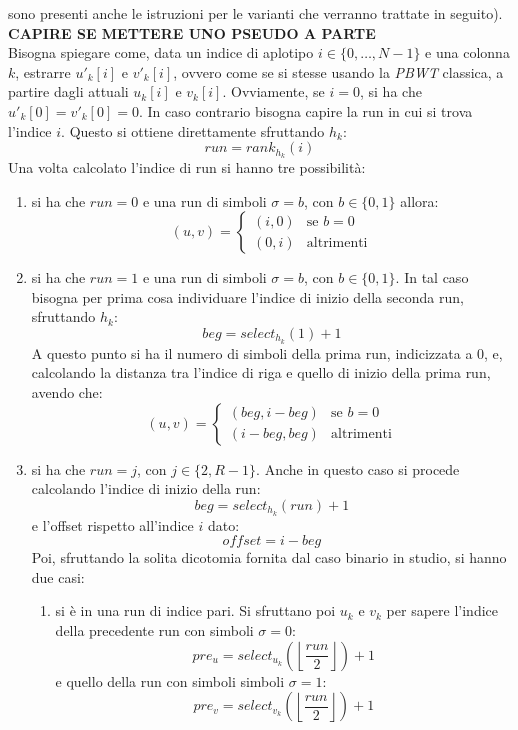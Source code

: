 sono presenti anche le istruzioni per le varianti che verranno trattate in
seguito).\\
\textbf{CAPIRE SE METTERE UNO PSEUDO A PARTE}\\
Bisogna spiegare come, data un indice di aplotipo $i\in\{0,\ldots,N-1\}$ e una
colonna $k$, estrarre $u'_k[i]$ e $v'_k[i]$, ovvero come se si stesse usando la
\textit{PBWT} classica, a partire dagli attuali $u_k[i]$ e $v_k[i]$. Ovviamente,
se $i=0$, si ha che $u'_k[0]=v'_k[0]=0$. In caso contrario bisogna capire la run
in cui si trova l'indice $i$. Questo si ottiene direttamente sfruttando $h_k$:
\[run = rank_{h_k}(i)\]
Una volta calcolato l'indice di run si hanno tre possibilità:
\begin{enumerate}
  \item si ha che $run=0$ e una run di simboli $\sigma=b$, con $b\in\{0,1\}$
  allora:
  \[(u,v)=
    \begin{cases}
      (i,0)&\mbox{se } b=0\\
      (0,i)&\mbox{altrimenti}
    \end{cases}
  \]
  \item si ha che $run=1$ e una run di simboli $\sigma=b$, con $b\in\{0,1\}$. In
  tal caso bisogna per prima cosa individuare l'indice di inizio della seconda
  run, sfruttando $h_k$:
  \[beg = select_{h_k}(1)+1\]
  A questo punto si ha il numero di simboli della prima run, indicizzata a 0, e,
  calcolando la distanza tra l'indice di riga e quello di inizio della prima
  run, avendo che:
  \[(u,v)=
    \begin{cases}
      (beg,i-beg)&\mbox{se } b=0\\
      (i-beg,beg)&\mbox{altrimenti}
    \end{cases}
  \]
  \item si ha che $run=j$, con $j\in\{2,R-1\}$. Anche in questo caso  si procede
  calcolando l'indice di inizio della run:
  \[beg = select_{h_k}(run)+1\]
  e l'offset rispetto all'indice $i$ dato:
  \[offset = i-beg\]
  Poi, sfruttando la solita dicotomia fornita dal caso binario in studio, si
  hanno due casi: 
  \begin{enumerate}
    \item si è in una run di indice pari.
    Si sfruttano poi $u_k$ e $v_k$ per sapere l'indice della precedente run con
    simboli $\sigma=0$:
    \[pre_u=select_{u_k}\left(\left\lfloor\frac{run}{2}\right\rfloor\right)+1\]
    e quello della run con simboli simboli $\sigma=1$:
    \[pre_v=select_{v_k}\left(\left\lfloor\frac{run}{2}\right\rfloor\right)+1\]

\end{enumerate}
\end{enumerate}
